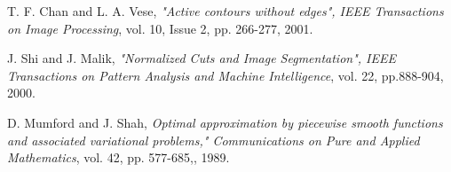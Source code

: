\documentclass{article}
\begin{document}
  \begin{thebibliography}{9}
    
    \bibitem{[ChanVese01]}
    T. F. Chan and L. A. Vese,
    \emph{"Active contours without edges", IEEE Transactions on Image Processing},
    vol. 10, Issue 2, pp. 266-277, 2001.
    
    
    \bibitem{[ShiMalik00]}
    J.  Shi  and  J.  Malik,
    \emph{"Normalized Cuts and Image Segmentation", IEEE Transactions on Pattern Analysis and Machine Intelligence},
    vol. 22, pp.888-904,
    2000.
    
    \bibitem{[MumfordShah89]}
    D. Mumford and J. Shah,
    \emph{Optimal approximation by piecewise smooth functions and associated
      variational problems," Communications on Pure and Applied Mathematics},
    vol. 42, pp. 577-685,,
    1989.
    
  \end{thebibliography}
  
\end{document}

